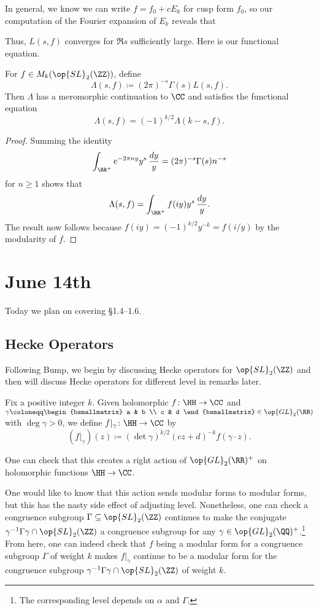 \documentclass{article}
\begin{document}
\begin{remark}
	In general, we know we can write $f=f_0+cE_k$ for cusp form $f_0$, so our computation of the Fourier expansion of $E_k$ reveals that 
\end{remark}
Thus, $L(s,f)$ converges for $\Re s$ sufficiently large. Here is our functional equation.
\begin{theorem}
	For $f\in M_k(\op{SL}_2(\ZZ))$, define
	\[\Lambda(s,f)\coloneqq(2\pi)^{-s}\Gamma(s)L(s,f).\]
	Then $\Lambda$ has a meromorphic continuation to $\CC$ and satisfies the functional equation
	\[\Lambda(s,f)=(-1)^{k/2}\Lambda(k-s,f).\]
\end{theorem}
\begin{proof}
	Summing the identity
	\[\int_{\RR^+}e^{-2\pi ny}y^s\,\frac{dy}y=(2\pi)^{-s}\Gamma(s)n^{-s}\]
	for $n\ge1$ shows that
	\[\Lambda(s,f)=\int_{\RR^+}f(iy)y^s\,\frac{dy}y.\]
	The result now follows because $f(iy)=(-1)^{k/2}y^{-k}=f(i/y)$ by the modularity of $f$.
\end{proof}

\section{June 14th}
Today we plan on covering \S1.4--1.6.

\subsection{Hecke Operators}
Following Bump, we begin by discussing Hecke operators for $\op{SL}_2(\ZZ)$ and then will discuss Hecke operators for different level in remarks later.
\begin{notation}
	Fix a positive integer $k$. Given holomorphic $f\colon\HH\to\CC$ and $\gamma\coloneqq\begin{bsmallmatrix}
		a & b \\ c & d
	\end{bsmallmatrix}\in\op{GL}_2(\RR)$ with $\deg\gamma>0$, we define $f|_\gamma\colon\HH\to\CC$ by
	\[(f|_\gamma)(z)\coloneqq(\det\gamma)^{k/2}(cz+d)^{-k}f(\gamma\cdot z).\]
\end{notation}
One can check that this creates a right action of $\op{GL}_2(\RR)^+$ on holomorphic functions $\HH\to\CC$.

One would like to know that this action sends modular forms to modular forms, but this has the nasty side effect of adjusting level. Nonetheless, one can check a congruence subgroup $\Gamma\subseteq\op{SL}_2(\ZZ)$ continues to make the conjugate $\gamma^{-1}\Gamma\gamma\cap\op{SL}_2(\ZZ)$ a congruence subgroup for any $\gamma\in\op{GL}_2(\QQ)^+$.\footnote{The corresponding level depends on $\alpha$ and $\Gamma$.} From here, one can indeed check that $f$ being a modular form for a congruence subgroup $\Gamma$ of weight $k$ makes $f|_\gamma$ continue to be a modular form for the congruence subgroup $\gamma^{-1}\Gamma\gamma\cap\op{SL}_2(\ZZ)$ of weight $k$.
\end{document}
